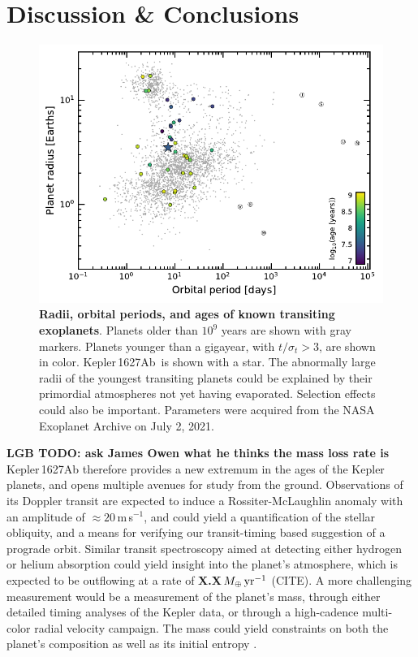 \documentclass[12pt,modern,twocolumn,tighten]{aastex63}
\newcommand{\pn}{Kepler\,1627Ab} %
\newcommand{\ms}{\,m\,s$^{-1}$}
\begin{document}
\section{Discussion \& Conclusions}
\label{sec:conc}

\begin{figure}[tp]
	\begin{center}
		\leavevmode
		\includegraphics[width=\textwidth]{f14.pdf}
	\end{center}
	\vspace{-0.7cm}
	\caption{
    {\bf Radii, orbital periods, and ages of known transiting
    exoplanets}.  Planets older than
    $10^9$ years are shown with gray markers.  Planets younger than a
    gigayear, with $t/\sigma_t > 3$, are shown in color.  
    \pn\ is shown with a star.
    The abnormally large radii of the youngest transiting planets
    could be explained by their primordial atmospheres not yet
    having evaporated.
    Selection effects could also be important.
    Parameters were acquired from the NASA Exoplanet Archive on July
    2, 2021.
		\label{fig:rp_period_age}
	}
\end{figure}


{\bf LGB TODO: ask James Owen what he thinks the mass loss rate is}
Kepler\,1627Ab therefore provides a new extremum in the ages of the
Kepler planets, and opens multiple avenues for study from the ground.
Observations of its Doppler transit are expected to induce a
Rossiter-McLaughlin anomaly with an amplitude of $\approx 20$\ms, and
could yield a quantification of the stellar obliquity, and a means for
verifying our transit-timing based suggestion of a prograde orbit.
Similar transit spectroscopy aimed at detecting either hydrogen or
helium absorption could yield insight into the planet's atmosphere,
which is expected to be outflowing at a rate of {\bf
X.X}\,$M_\oplus\,{\rm yr}^{-1}$ (CITE).  A more challenging
measurement would be a measurement of the planet's mass, through
either detailed timing analyses of the Kepler data, or through a
high-cadence multi-color radial velocity campaign.  The mass could
yield constraints on both the planet's composition as well as its
initial entropy \citep{owen_constraining_2020}.
\end{document}
